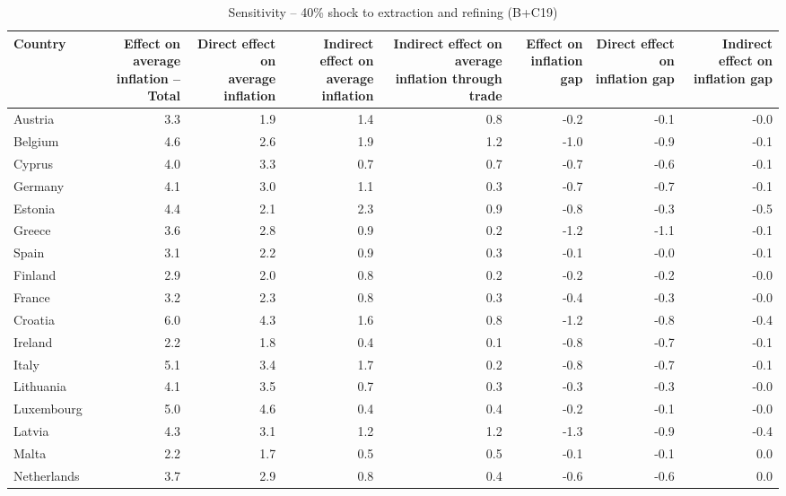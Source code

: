 \documentclass[11pt]{article}
\begin{document}
\begin{table}[H]
\centering
\caption{Sensitivity -- 40\% shock to extraction and refining (B+C19)}
\scriptsize
\setlength{\tabcolsep}{1.2pt}
\begin{tabular}{lrrrrrrr}
\toprule
Country & \shortstack{Effect on average\\inflation -- Total} & \shortstack{Direct effect on\\average inflation} & \shortstack{Indirect effect on\\average inflation} & \shortstack{Indirect effect on average\\inflation through trade} & \shortstack{Effect on\\inflation gap} & \shortstack{Direct effect on\\inflation gap} & \shortstack{Indirect effect on\\inflation gap}
 \\
\midrule
Austria & 3.3 & 1.9 & 1.4 & 0.8 & -0.2 & -0.1 & -0.0
 \\
Belgium & 4.6 & 2.6 & 1.9 & 1.2 & -1.0 & -0.9 & -0.1
 \\
Cyprus & 4.0 & 3.3 & 0.7 & 0.7 & -0.7 & -0.6 & -0.1
 \\
Germany & 4.1 & 3.0 & 1.1 & 0.3 & -0.7 & -0.7 & -0.1
 \\
Estonia & 4.4 & 2.1 & 2.3 & 0.9 & -0.8 & -0.3 & -0.5
 \\
Greece & 3.6 & 2.8 & 0.9 & 0.2 & -1.2 & -1.1 & -0.1
 \\
Spain & 3.1 & 2.2 & 0.9 & 0.3 & -0.1 & -0.0 & -0.1
 \\
Finland & 2.9 & 2.0 & 0.8 & 0.2 & -0.2 & -0.2 & -0.0
 \\
France & 3.2 & 2.3 & 0.8 & 0.3 & -0.4 & -0.3 & -0.0
 \\
Croatia & 6.0 & 4.3 & 1.6 & 0.8 & -1.2 & -0.8 & -0.4
 \\
Ireland & 2.2 & 1.8 & 0.4 & 0.1 & -0.8 & -0.7 & -0.1
 \\
Italy & 5.1 & 3.4 & 1.7 & 0.2 & -0.8 & -0.7 & -0.1
 \\
Lithuania & 4.1 & 3.5 & 0.7 & 0.3 & -0.3 & -0.3 & -0.0
 \\
Luxembourg & 5.0 & 4.6 & 0.4 & 0.4 & -0.2 & -0.1 & -0.0
 \\
Latvia & 4.3 & 3.1 & 1.2 & 1.2 & -1.3 & -0.9 & -0.4
 \\
Malta & 2.2 & 1.7 & 0.5 & 0.5 & -0.1 & -0.1 & 0.0
 \\
Netherlands & 3.7 & 2.9 & 0.8 & 0.4 & -0.6 & -0.6 & 0.0
 \\

\end{tabular}
\end{table}
\end{document}
